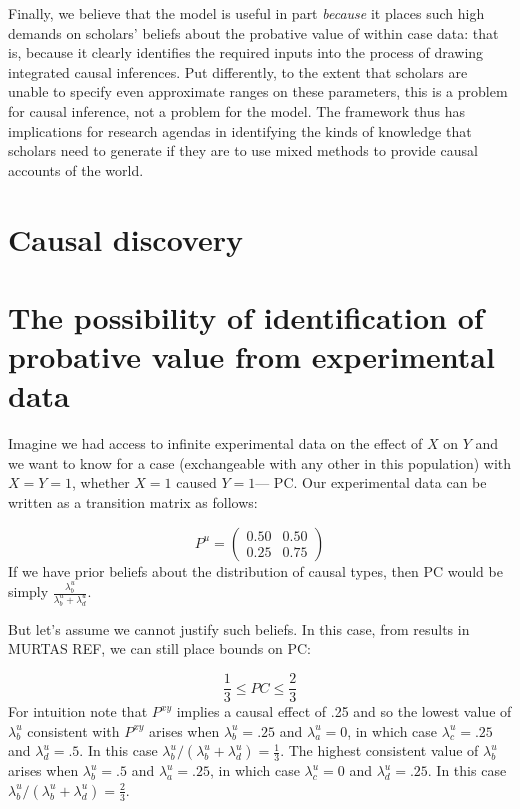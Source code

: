 \documentclass[12pt,]{book}
\begin{document}
Finally, we believe that the model is useful in part \emph{because} it places such high demands on scholars' beliefs about the probative value of within case data: that is, because it clearly identifies the required inputs into the process of drawing integrated causal inferences. Put differently, to the extent that scholars are unable to specify even approximate ranges on these parameters, this is a problem for causal inference, not a problem for the model. The framework thus has implications for research agendas in identifying the kinds of knowledge that scholars need to generate if they are to use mixed methods to provide causal accounts of the world.

\hypertarget{causal-discovery}{%
\section{Causal discovery}\label{causal-discovery}}

\hypertarget{the-possibility-of-identification-of-probative-value-from-experimental-data}{%
\section{The possibility of identification of probative value from experimental data}\label{the-possibility-of-identification-of-probative-value-from-experimental-data}}

Imagine we had access to infinite experimental data on the effect of \(X\) on \(Y\) and we want to know for a case (exchangeable with any other in this population) with \(X=Y=1\), whether \(X=1\) caused \(Y=1\)--- PC. Our experimental data can be written as a transition matrix as follows:

\[P^{u}=\left( \begin{array}{cc} 0.50 & 0.50 \\ 0.25 & 0.75 \end{array}\right)\]
If we have prior beliefs about the distribution of causal types, then PC would be simply \(\frac{\lambda^u_b}{\lambda^u_b + \lambda^u_d}\).

But let's assume we cannot justify such beliefs. In this case, from results in MURTAS REF, we can still place bounds on PC:

\[\frac13 \leq PC \leq \frac23 \]
For intuition note that \(P^{xy}\) implies a causal effect of .25 and so the lowest value of \(\lambda_b^u\) consistent with \(P^{xy}\) arises when \(\lambda_b^u = .25\) and \(\lambda_a^u = 0\), in which case \(\lambda_c^u = .25\) and \(\lambda_d^u = .5\). In this case \(\lambda_b^u/(\lambda_b^u+ \lambda_d^u)=\frac{1}{3}\). The highest consistent value of \(\lambda_b^u\) arises when \(\lambda_b^u = .5\) and \(\lambda_a^u = .25\), in which case \(\lambda_c^u = 0\) and \(\lambda_d^u = .25\). In this case \(\lambda_b^u/(\lambda_b^u+ \lambda_d^u)=\frac{2}{3}\).
\end{document}
